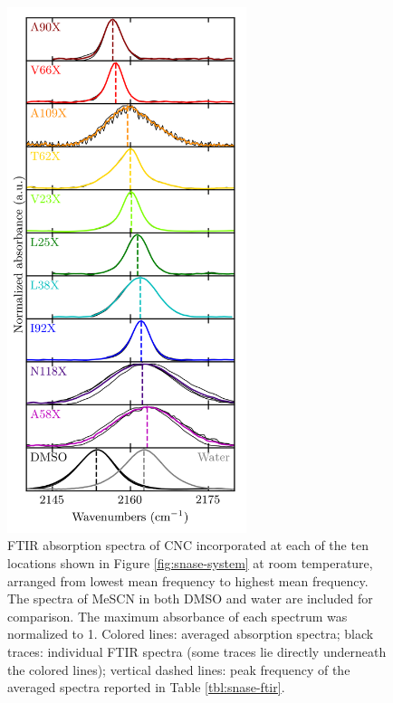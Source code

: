 \begin{figure}
    \center
    \includegraphics[width=2.75in]{figures-snase/spectra.png}
    \caption[FTIR absorption spectra of each CNC incorporated in SNase]{
        FTIR absorption spectra of CNC incorporated at each of the ten locations shown in Figure \ref{fig:snase-system} at room temperature, arranged from lowest mean frequency to highest mean frequency. 
        The spectra of MeSCN in both DMSO and water are included for comparison. 
        The maximum absorbance of each spectrum was normalized to 1. 
        Colored lines: averaged absorption spectra; 
        black traces: individual FTIR spectra (some traces lie directly underneath the colored lines); 
        vertical dashed lines: peak frequency of the averaged spectra reported in Table \ref{tbl:snase-ftir}.
    }
    \label{fig:snase-ftir}
\end{figure}

